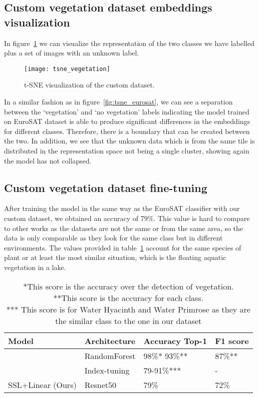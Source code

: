 \documentclass[conference]{IEEEtran}
\begin{document}
    \subsection{Custom vegetation dataset embeddings visualization}
    In figure~\ref{fig:tsne_vegetation} we can visualize the representation of the two classes we have labelled plus a set of images
    with an unknown label.

    \begin{figure}[t]
        \centering
        \texttt{[image: tsne\_vegetation]}
        \caption{t-SNE visualization of the custom dataset.}
        \label{fig:tsne_vegetation}
    \end{figure}

    In a similar fashion as in figure~\ref{fig:tsne_eurosat}, we can see a separation between the `vegetation' and `no vegetation' labels
    indicating the model trained on EuroSAT dataset is able to produce significant differences in the embeddings for different classes.
    Therefore, there is a boundary that can be created between the two.
    In addition, we see that the unknown data which is from the same tile is distributed in the representation space not being a single cluster,
    showing again the model has not collapsed.

    \subsection{Custom vegetation dataset fine-tuning}
    After training the model in the same way as the EuroSAT classifier with our custom dataset, we obtained an accuracy of 79\%.
    This value is hard to compare to other works as the datasets are not the same or from the same area, so the data is only comparable as they look for the same
    class but in different environments.
    The values provided in table~\ref{table:vegetation_results} account for the same species of plant or at least the most similar situation,
    which is the floating aquatic vegetation in a lake.
    \begin{table}[h!]
        \centering
        \begin{tabular}{ |p{2.2cm}||p{1.5cm}|p{2.2cm}|p{1cm}|}
            \hline
            Model              & Architecture & Accuracy Top-1 & F1 score \\
            \hline
            \hline
            \citet{rs12244021} & RandomForest & 98\%* 93\%**   & 87\%**   \\
            \citet{rs14133013} & Index-tuning & 79-91\%***     & -        \\
            SSL+Linear (Ours)  & Resnet50     & 79\%           & 72\%     \\
            \hline
        \end{tabular}
        \caption{
            *This score is the accuracy over the detection of vegetation. \\
            **This score is the accuracy for each class. \\
            *** This score is for Water Hyacinth and Water Primrose as they are the similar class to the one in our dataset}
        \label{table:vegetation_results}
    \end{table}
\end{document}
